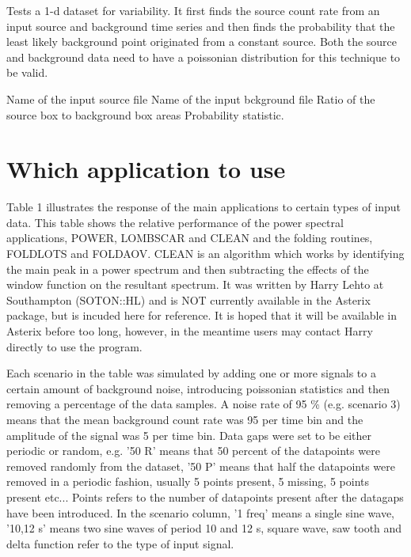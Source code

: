 
\begin{manroutinedescription}

Tests a 1-d dataset for variability. It first finds the source count 
rate from an input source and background time series and then finds 
the probability that the least likely background point originated from 
a constant source. Both the source and background data need to have
a poissonian distribution for this technique to be valid.

\begin{manparametertable}
   Name of the input source file
   Name of the input bckground file
   Ratio of the source box to background box areas
   Probability statistic.
\end{manparametertable}

\end{manroutinedescription}

\newpage

\section{Which application to use}

Table 1 illustrates the response of the main applications
to certain types of input data. This table shows the relative 
performance of the power spectral applications, POWER, LOMBSCAR
and CLEAN and the folding routines, FOLDLOTS and FOLDAOV. CLEAN
is an algorithm which works by identifying the main peak in a
power spectrum and then subtracting the effects of the window function
on the resultant spectrum. It was written by Harry Lehto at Southampton
(SOTON::HL) and is NOT currently available in the Asterix package, but
is incuded here for reference. It is hoped that it will be available 
in Asterix before too long, however, in the meantime users may contact 
Harry directly to use the program.

Each scenario in the table was simulated by adding one or more signals 
to a certain amount of background noise, introducing poissonian 
statistics and then removing a percentage of the data samples.
A noise rate of 95 \% (e.g. scenario 3) means that the mean background 
count rate was 95 per time bin and the amplitude of the signal was
5 per time bin. Data gaps were set to be either periodic or random,
e.g. '50 R' means that 50 percent of the datapoints were removed
randomly from the dataset, '50 P' means that half the datapoints
were removed in a periodic fashion, usually 5 points present, 5 missing,
5 points present etc... Points refers to the number of datapoints
present after the datagaps have been introduced. In the scenario
column, '1 freq' means a single sine wave, '10,12 s' means two sine
waves of period 10 and 12 s, square wave, saw tooth and delta
function refer to the type of input signal.

